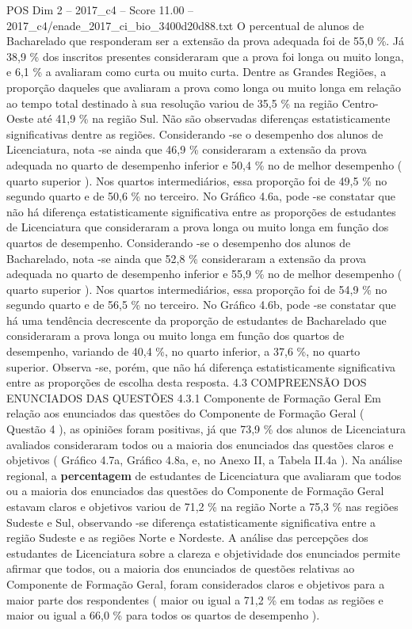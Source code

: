 \begin{textsample}{POS Dim 2 – 2017\_c4 – Score 11.00 – 2017\_c4/enade\_2017\_ci\_bio\_3400d20d88.txt}
O percentual de alunos de Bacharelado que responderam ser a extensão da prova adequada foi de 55,0 \%.
Já 38,9 \% dos inscritos presentes consideraram que a prova foi longa ou muito longa, e 6,1 \% a avaliaram como curta ou muito curta.
Dentre as Grandes Regiões, a proporção daqueles que avaliaram a prova como longa ou muito longa em relação ao tempo total destinado à sua resolução variou de 35,5 \% na região Centro-Oeste até 41,9 \% na região Sul.
Não são observadas diferenças estatisticamente significativas dentre as regiões.
Considerando -se o desempenho dos alunos de Licenciatura, nota -se ainda que 46,9 \% consideraram a extensão da prova adequada no quarto de desempenho inferior e 50,4 \% no de melhor desempenho ( quarto superior ).
Nos quartos intermediários, essa proporção foi de 49,5 \% no segundo quarto e de 50,6 \% no terceiro.
No Gráfico 4.6a, pode -se constatar que não há diferença estatisticamente significativa entre as proporções de estudantes de Licenciatura que consideraram a prova longa ou muito longa em função dos quartos de desempenho.
Considerando -se o desempenho dos alunos de Bacharelado, nota -se ainda que 52,8 \% consideraram a extensão da prova adequada no quarto de desempenho inferior e 55,9 \% no de melhor desempenho ( quarto superior ).
Nos quartos intermediários, essa proporção foi de 54,9 \% no segundo quarto e de 56,5 \% no terceiro.
No Gráfico 4.6b, pode -se constatar que há uma tendência decrescente da proporção de estudantes de Bacharelado que consideraram a prova longa ou muito longa em função dos quartos de desempenho, variando de 40,4 \%, no quarto inferior, a 37,6 \%, no quarto superior.
Observa -se, porém, que não há diferença estatisticamente significativa entre as proporções de escolha desta resposta. 4.3 COMPREENSÃO DOS ENUNCIADOS DAS QUESTÕES 4.3.1 Componente de Formação Geral Em relação aos enunciados das questões do Componente de Formação Geral ( Questão 4 ), as opiniões foram positivas, já que 73,9 \% dos alunos de Licenciatura avaliados consideraram todos ou a maioria dos enunciados das questões claros e objetivos ( Gráfico 4.7a, Gráfico 4.8a, e, no Anexo II, a Tabela II.4a ).
Na análise regional, a \textbf{percentagem} de estudantes de Licenciatura que avaliaram que todos ou a maioria dos enunciados das questões do Componente de Formação Geral estavam claros e objetivos variou de 71,2 \% na região Norte a 75,3 \% nas regiões Sudeste e Sul, observando -se diferença estatisticamente significativa entre a região Sudeste e as regiões Norte e Nordeste.
A análise das percepções dos estudantes de Licenciatura sobre a clareza e objetividade dos enunciados permite afirmar que todos, ou a maioria dos enunciados de questões relativas ao Componente de Formação Geral, foram considerados claros e objetivos para a maior parte dos respondentes ( maior ou igual a 71,2 \% em todas as regiões e maior ou igual a 66,0 \% para todos os quartos de desempenho ).

\end{textsample}
